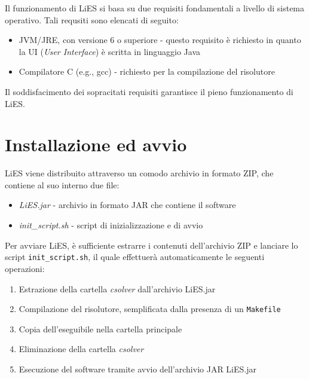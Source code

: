 \documentclass{article}
\begin{document}
Il funzionamento di LiES si basa su due requisiti fondamentali a livello di sistema operativo. Tali requsiti sono elencati di seguito:

\begin{itemize}
	\item JVM/JRE, con versione 6 o superiore - questo requisito è richiesto in quanto la UI (\textit{User Interface}) è scritta in linguaggio Java
	\item Compilatore C (e.g., gcc) - richiesto per la compilazione del risolutore
\end{itemize}

Il soddisfacimento dei sopracitati requisiti garantisce il pieno funzionamento di LiES.


\section{Installazione ed avvio}
\label{sec:installazione_avvio}

LiES viene distribuito attraverso un comodo archivio in formato ZIP, che contiene al suo interno due file:
\begin{itemize}
	\item {\emph{LiES.jar}} - archivio in formato JAR che contiene il software
	\item {\emph{init\_script.sh}} - script di inizializzazione e di avvio
\end{itemize}

Per avviare LiES, è sufficiente estrarre i contenuti dell'archivio ZIP e lanciare lo script \verb+init_script.sh+, il quale effettuerà automaticamente le seguenti operazioni:
\begin{enumerate}
	\item Estrazione della cartella \textit{csolver} dall'archivio LiES.jar
	\item Compilazione del risolutore, semplificata dalla presenza di un \verb+Makefile+
	\item Copia dell'eseguibile nella cartella principale
	\item Eliminazione della cartella \textit{csolver}
	\item Esecuzione del software tramite avvio dell'archivio JAR LiES.jar
\end{enumerate}
\end{document}
